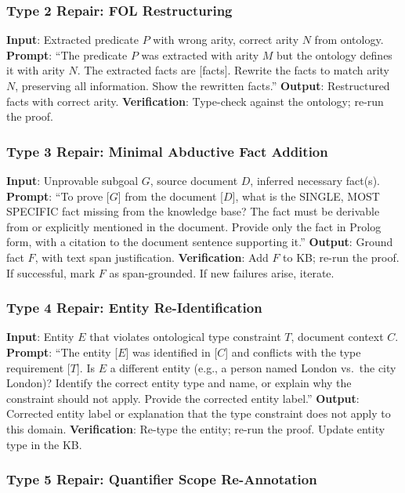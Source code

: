\documentclass[11pt,letterpaper]{article}
\begin{document}
\subsubsection{Type 2 Repair: FOL Restructuring}

\textbf{Input}: Extracted predicate $P$ with wrong arity, correct arity $N$ from ontology.
\textbf{Prompt}: ``The predicate $P$ was extracted with arity $M$ but the ontology defines it with arity $N$. The extracted facts are [facts]. Rewrite the facts to match arity $N$, preserving all information. Show the rewritten facts.''
\textbf{Output}: Restructured facts with correct arity.
\textbf{Verification}: Type-check against the ontology; re-run the proof.

\subsubsection{Type 3 Repair: Minimal Abductive Fact Addition}

\textbf{Input}: Unprovable subgoal $G$, source document $D$, inferred necessary fact(s).
\textbf{Prompt}: ``To prove [$G$] from the document [$D$], what is the SINGLE, MOST SPECIFIC fact missing from the knowledge base? The fact must be derivable from or explicitly mentioned in the document. Provide only the fact in Prolog form, with a citation to the document sentence supporting it.''
\textbf{Output}: Ground fact $F$, with text span justification.
\textbf{Verification}: Add $F$ to KB; re-run the proof. If successful, mark $F$ as span-grounded. If new failures arise, iterate.

\subsubsection{Type 4 Repair: Entity Re-Identification}

\textbf{Input}: Entity $E$ that violates ontological type constraint $T$, document context $C$.
\textbf{Prompt}: ``The entity [$E$] was identified in [$C$] and conflicts with the type requirement [$T$]. Is $E$ a different entity (e.g., a person named London vs.\ the city London)? Identify the correct entity type and name, or explain why the constraint should not apply. Provide the corrected entity label.''
\textbf{Output}: Corrected entity label or explanation that the type constraint does not apply to this domain.
\textbf{Verification}: Re-type the entity; re-run the proof. Update entity type in the KB.

\subsubsection{Type 5 Repair: Quantifier Scope Re-Annotation}
\end{document}

